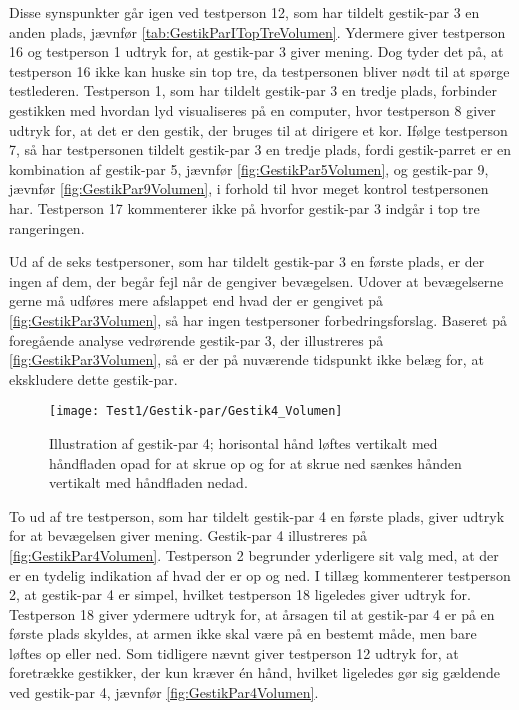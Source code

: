 Disse synspunkter går igen ved testperson 12, som har tildelt gestik-par 3 en anden plads, jævnfør \autoref{tab:GestikParITopTreVolumen}. Ydermere giver testperson 16 og testperson 1 udtryk for, at gestik-par 3 giver mening. Dog tyder det på, at testperson 16 ikke kan huske sin top tre, da testpersonen bliver nødt til at spørge testlederen. Testperson 1, som har tildelt gestik-par 3 en tredje plads, forbinder gestikken med hvordan lyd visualiseres på en computer, hvor testperson 8 giver udtryk for, at det er den gestik, der bruges til at dirigere et kor. Ifølge testperson 7, så har testpersonen tildelt gestik-par 3 en tredje plads, fordi gestik-parret er en kombination af gestik-par 5, jævnfør \autoref{fig:GestikPar5Volumen}, og gestik-par 9, jævnfør \autoref{fig:GestikPar9Volumen}, i forhold til hvor meget kontrol testpersonen har. Testperson 17 kommenterer ikke på hvorfor gestik-par 3 indgår i top tre rangeringen.

Ud af de seks testpersoner, som har tildelt gestik-par 3 en første plads, er der ingen af dem, der begår fejl når de gengiver bevægelsen. Udover at bevægelserne gerne må udføres mere afslappet end hvad der er gengivet på \autoref{fig:GestikPar3Volumen}, så har ingen testpersoner forbedringsforslag. Baseret på foregående analyse vedrørende gestik-par 3, der illustreres på \autoref{fig:GestikPar3Volumen}, så er der på nuværende tidspunkt ikke belæg for, at ekskludere dette gestik-par.
%
\begin{figure}[H]
	\centering
	\texttt{[image: Test1/Gestik-par/Gestik4\_Volumen]}
	\caption{Illustration af gestik-par 4; horisontal hånd løftes vertikalt med håndfladen opad for at skrue op og for at skrue ned sænkes hånden vertikalt med håndfladen nedad.}
	\label{fig:GestikPar4Volumen}
\end{figure}
\noindent
%
To ud af tre testperson, som har tildelt gestik-par 4 en første plads, giver udtryk for at bevægelsen giver mening. Gestik-par 4 illustreres på \autoref{fig:GestikPar4Volumen}. Testperson 2 begrunder yderligere sit valg med, at der er en tydelig indikation af hvad der er op og ned.  I tillæg kommenterer testperson 2, at gestik-par 4 er simpel, hvilket testperson 18 ligeledes giver udtryk for. Testperson 18 giver ydermere udtryk for, at årsagen til at gestik-par 4 er på en første plads skyldes, at armen ikke skal være på en bestemt måde, men bare løftes op eller ned. Som tidligere nævnt giver testperson 12 udtryk for, at foretrække gestikker, der kun kræver én hånd, hvilket ligeledes gør sig gældende ved gestik-par 4, jævnfør \autoref{fig:GestikPar4Volumen}. 

